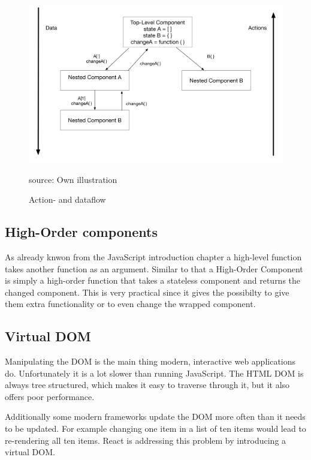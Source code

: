 \begin{figure}[H]
	\centering
	\includegraphics[width=0.8\linewidth]{bilder/grundlagen/dataFlow.png}
	\caption{Action- and dataflow} source: Own illustration
	\label{fig:DataFlow}
\end{figure}


\subsection{High-Order components}
As already knwon from the JavaScript introduction chapter
a high-level function takes another function as an argument. Similar to that a High-Order Component is simply a high-order function that takes a stateless component and returns the changed component. This is very practical since it gives the possibilty to give them extra functionality or to even change the wrapped component. 








\subsection{Virtual DOM}

Manipulating the DOM is the main thing modern, interactive web applications do. Unfortunately it is a lot slower than running JavaScript. The HTML DOM is always tree structured, which makes it easy to traverse through it, but it also offers poor performance.

Additionally some modern frameworks update the DOM more often than it needs to be updated. For example changing one item in a list of ten items would lead to re-rendering all ten items. React is addressing this problem by introducing a virtual DOM.

